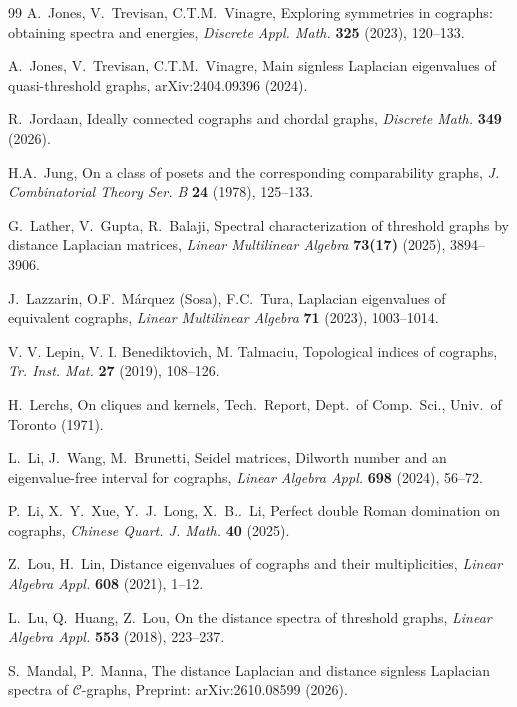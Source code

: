 \documentclass[11pt]{article}
\theoremstyle{plain}
\theoremstyle{definition}
\theoremstyle{remark}
\begin{document}
\begin{thebibliography}{99}
		 A.~Jones, V.~Trevisan, C.T.M.~Vinagre, Exploring symmetries in cographs: obtaining spectra and energies, \emph{Discrete Appl. Math.} \textbf{325} (2023), 120--133.
		
		 A.~Jones, V.~Trevisan, C.T.M.~Vinagre, Main signless Laplacian eigenvalues of quasi-threshold graphs, arXiv:2404.09396 (2024).
		
		 R.~Jordaan, Ideally connected cographs and chordal graphs, \emph{Discrete Math.} \textbf{349} (2026).
		
		 H.A.~Jung, On a class of posets and the corresponding comparability graphs, \emph{J. Combinatorial Theory Ser. B} \textbf{24} (1978), 125--133.
		
		 G.~Lather, V.~Gupta, R.~Balaji, Spectral characterization of threshold graphs by distance Laplacian matrices, \emph{Linear Multilinear Algebra} \textbf{73(17)} (2025), 3894--3906.
		
		 J.~Lazzarin, O.F.~M\'arquez (Sosa), F.C.~Tura, Laplacian eigenvalues of equivalent cographs, \emph{Linear Multilinear Algebra} \textbf{71} (2023), 1003--1014.
		
		V. V. Lepin, V. I. Benediktovich, M. Talmaciu, 
		Topological indices of cographs, \emph{Tr. Inst. Mat.} \textbf{27} (2019), 108--126.
		
		 H.~Lerchs, On cliques and kernels, Tech.\ Report, Dept.\ of Comp.\ Sci., Univ.\ of Toronto (1971).
		
		 L.~Li, J.~Wang, M.~Brunetti, Seidel matrices, Dilworth number and an eigenvalue-free interval for cographs, \emph{Linear Algebra Appl.} \textbf{698} (2024), 56--72.
		
		 P.~Li, X.~Y.~Xue, Y.~J.~Long, X.~B..~Li, Perfect double Roman domination on cographs, \emph{Chinese Quart. J. Math.} \textbf{40} (2025).
		
		 Z.~Lou, H.~Lin, Distance eigenvalues of cographs and their multiplicities, \emph{Linear Algebra Appl.} \textbf{608} (2021), 1--12.
		
		 L.~Lu, Q.~Huang, Z.~Lou, On the distance spectra of threshold graphs, \emph{Linear Algebra Appl.} \textbf{553} (2018), 223--237.
		
		 S.~Mandal, P.~Manna, The distance Laplacian and distance signless Laplacian spectra of $\mathcal C$-graphs, Preprint: arXiv:2610.08599 (2026).
		

\end{thebibliography}
\end{document}
